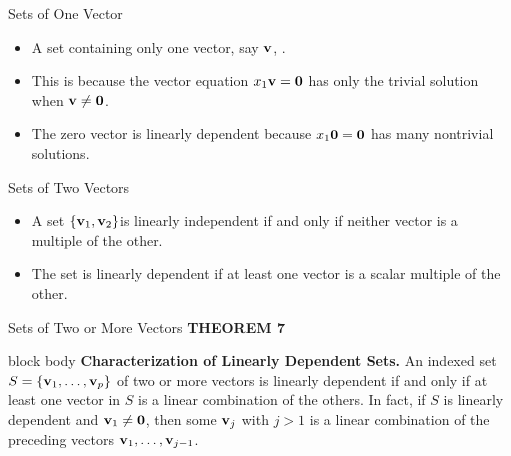 \begin{frame}{Sets of One Vector}
\begin{itemize}
\item A set containing only one vector, say $\vect v$, {\color{red}{is linearly independent
if and only if $\vect v$ is not the zero vector $\vect 0$}}.\pause
\item This is because the vector equation $x_1\mathbf{v}=\mathbf{0}$ has only the trivial solution when
$\mathbf{v}\ne\mathbf{0}$.\pause
\item The zero vector is linearly dependent because $x_1\mathbf{0}=\mathbf{0}$ has many nontrivial solutions.
\end{itemize}
\end{frame}

\begin{frame}{Sets of Two Vectors}
\begin{itemize}
\item  A set $\{\mathbf{v}_1,\mathbf{v}_2\}$is linearly independent if and only if neither vector is a
multiple of the other.\pause
\item The set is linearly dependent if at least one
vector is a scalar multiple of the other.
\end{itemize}
\end{frame}

\begin{frame}{Sets of Two or More Vectors}
\textcolor{lectureblue}{\bfseries THEOREM 7}
\begin{beamercolorbox}[sep=1ex,wd=\linewidth]{block body}
\textbf{Characterization of Linearly Dependent Sets.}
An indexed set $S=\{\mathbf{v}_1,\ldots,\mathbf{v}_p\}$ of two or more vectors is
linearly dependent if and only if at least one vector in $S$ is a linear
combination of the others. In fact, if $S$ is linearly dependent and
$\mathbf{v}_1\ne\mathbf{0}$, then some $\mathbf{v}_j$ with $j>1$ is a linear combination
of the preceding vectors $\mathbf{v}_1,\ldots,\mathbf{v}_{j-1}$.
\end{beamercolorbox}
\end{frame}

